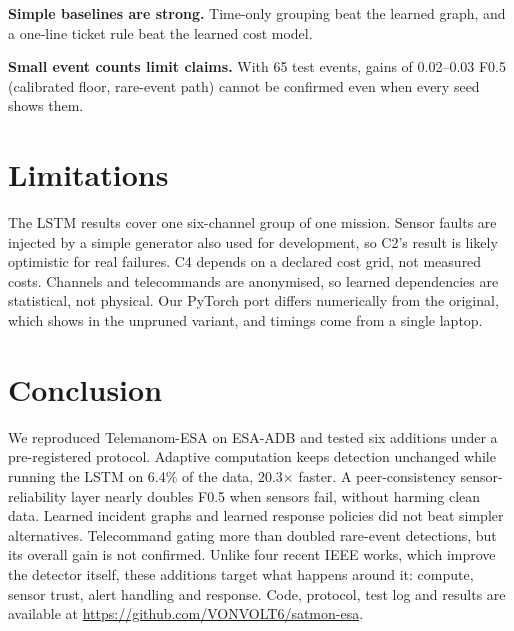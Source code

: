 \documentclass[conference]{IEEEtran}
\begin{document}
\textbf{Simple baselines are strong.} Time-only grouping beat the learned graph, and a one-line ticket rule beat the learned cost model.

\textbf{Small event counts limit claims.} With 65 test events, gains of 0.02--0.03 F0.5 (calibrated floor, rare-event path) cannot be confirmed even when every seed shows them.

\section{Limitations}
The LSTM results cover one six-channel group of one mission. Sensor faults are injected by a simple generator also used for development, so C2's result is likely optimistic for real failures. C4 depends on a declared cost grid, not measured costs. Channels and telecommands are anonymised, so learned dependencies are statistical, not physical. Our PyTorch port differs numerically from the original, which shows in the unpruned variant, and timings come from a single laptop.

\section{Conclusion}
We reproduced Telemanom-ESA on ESA-ADB and tested six additions under a pre-registered protocol. Adaptive computation keeps detection unchanged while running the LSTM on 6.4\% of the data, 20.3$\times$ faster. A peer-consistency sensor-reliability layer nearly doubles F0.5 when sensors fail, without harming clean data. Learned incident graphs and learned response policies did not beat simpler alternatives. Telecommand gating more than doubled rare-event detections, but its overall gain is not confirmed. Unlike four recent IEEE works, which improve the detector itself, these additions target what happens around it: compute, sensor trust, alert handling and response. Code, protocol, test log and results are available at \url{https://github.com/VONVOLT6/satmon-esa}.



\end{document}
